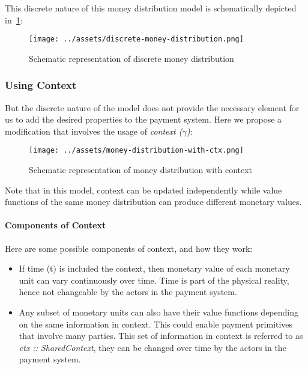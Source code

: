 This discrete nature of this money distribution model is schematically depicted in~\ref{fig:discrete-md}:

\begin{figure}[h]
    \centering
    \texttt{[image: ../assets/discrete-money-distribution.png]}
    \caption{Schematic representation of discrete money distribution}
    \label{fig:discrete-md}
\end{figure}

\subsubsection{Using Context}

But the discrete nature of the model does not provide the necessary element for us to add the desired properties to the
payment system. Here we propose a modification that involves the usage of \textit{context ($\gamma$)}:

\begin{figure}[h]
    \centering
    \texttt{[image: ../assets/money-distribution-with-ctx.png]}
    \caption{Schematic representation of money distribution with context}
    \label{fig:md-with-ctx}
\end{figure}

Note that in this model, context can be updated independently while value functions of the same money distribution can
produce different monetary values.

\paragraph{Components of Context}

Here are some possible components of context, and how they work:

\begin{itemize}
\item If time (t) is included the context, then monetary value of each monetary unit can vary continuously over
    time. Time is part of the physical reality, hence not changeable by the actors in the payment system.
\item Any subset of monetary units can also have their value functions depending on the same information in
    context. This could enable payment primitives that involve many parties. This set of information in context is
    referred to as \textit{ctx :: SharedContext}, they can be changed over time by the actors in the payment system.
\end{itemize}

